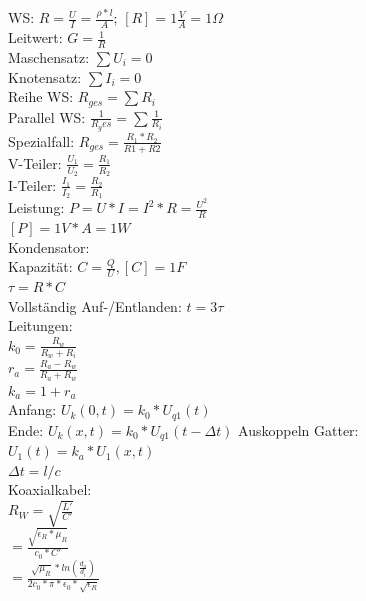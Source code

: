 \documentclass[11pt]{article}
\begin{document}
\begin{landscape}

\begin{minipage}{0.45\textwidth}
WS: $R = \frac{U}{I} = \frac{\rho * l}{A}$; $[R] = 1\frac{V}{A} =1 \Omega$ \\
Leitwert: $G = \frac{1}{R}$\\
Maschensatz: $\sum U_i = 0$\\
Knotensatz: $\sum I_i = 0$\\
Reihe WS: $R_{ges} = \sum R_i$\\
Parallel WS: $\frac{1}{R_ges} = \sum \frac{1}{R_i}$\\
\phantom{ss} Spezialfall: $R_{ges} = \frac{R_1 * R_2}{R1+R2} $\\
V-Teiler: $\frac{U_1}{U_2} = \frac{R_1}{R_2}$\\
I-Teiler: $\frac{I_1}{I_2} = \frac{R_2}{R_1}$\\
Leistung: $P =U*I = I^2*R = \frac{U^2}{R}$ \\
\phantom{ssssssssss} $[P] = 1V*A =1 W$\\
Kondensator:\\
Kapazität: $C = \frac{Q}{U}, [C]=1F$\\
$\tau = R*C$\\
Vollständig Auf-/Entlanden: $t = 3\tau$\\
Leitungen:\\
$k_0 = \frac{R_w}{R_w + R_i} $\\
$r_a = \frac{R_a - R_w}{R_a + R_w} $\\
$k_a = 1 + r_a$\\
Anfang: $U_k(0,t)=k_0*U_{q1}(t)$\\
Ende: $U_k(x,t)= k_0*U_{q1}(t-\Delta t)$
Auskoppeln Gatter:\\
\phantom{ss} $U_1(t) = k_a * U_1(x,t)$\\
$\Delta t = l/c$\\
Koaxialkabel:\\
$R_W = \sqrt{\frac{L'}{C'}}$\\
    \phantom{ss} $=\frac{\sqrt{\epsilon_R * \mu_R}}{c_0 * C'}$\\
    \phantom{ss} $=\frac{\sqrt{\mu_R} * ln(\frac{d_a}{d_i})}{2c_0 * \pi * \epsilon_0 *\sqrt{\epsilon_R}}$
\end{minipage}%
~~~~~~~
\begin{minipage}{0.3\textwidth}


\end{minipage}
\end{landscape}
\end{document}
